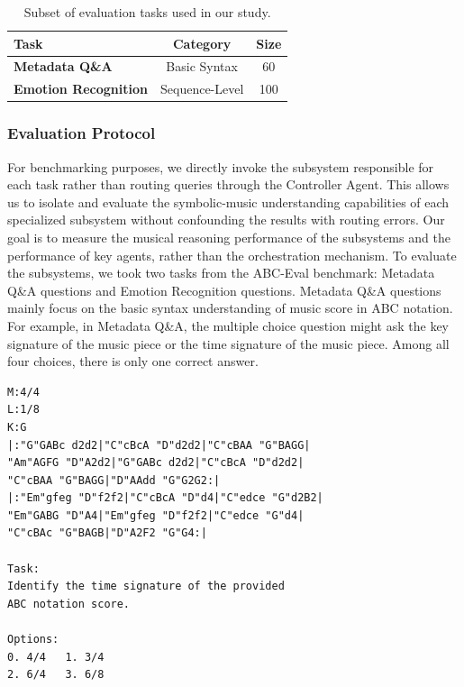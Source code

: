 \documentclass[sigconf]{acmart}
\begin{document}
\begin{table}[H]
\centering
\begin{tabular}{lcc}
\toprule
\textbf{Task} & \textbf{Category} & \textbf{Size} \\
\midrule
\textbf{Metadata Q\&A} & Basic Syntax & 60 \\
\textbf{Emotion Recognition} & Sequence-Level & 100 \\
\bottomrule
\end{tabular}
\caption{Subset of evaluation tasks used in our study.}
\label{tab:tasks}
\end{table}

\subsubsection {Evaluation Protocol}
For benchmarking purposes, we directly invoke the subsystem responsible for each task rather than routing queries through the Controller Agent. This allows us to isolate and evaluate the symbolic-music understanding capabilities of each specialized subsystem without confounding the results with routing errors. Our goal is to measure the musical reasoning performance of the subsystems and the performance of key agents, rather than the orchestration mechanism. To evaluate the subsystems, we took two tasks from the ABC-Eval benchmark: Metadata Q\&A questions and Emotion Recognition questions. Metadata Q\&A questions mainly focus on the basic syntax understanding of music score in ABC notation. For example, in Metadata Q\&A, the multiple choice question might ask the key signature of the music piece or the time signature of the music piece. Among all four choices, there is only one correct answer. 

\begin{tcolorbox}[title=Metadata Q\&A, colback=gray!10, colframe=gray!60, listing only]
\begin{verbatim}
M:4/4
L:1/8
K:G
|:"G"GABc d2d2|"C"cBcA "D"d2d2|"C"cBAA "G"BAGG|
"Am"AGFG "D"A2d2|"G"GABc d2d2|"C"cBcA "D"d2d2|
"C"cBAA "G"BAGG|"D"AAdd "G"G2G2:|
|:"Em"gfeg "D"f2f2|"C"cBcA "D"d4|"C"edce "G"d2B2|
"Em"GABG "D"A4|"Em"gfeg "D"f2f2|"C"edce "G"d4|
"C"cBAc "G"BAGB|"D"A2F2 "G"G4:|

Task:
Identify the time signature of the provided 
ABC notation score.

Options:
0. 4/4   1. 3/4
2. 6/4   3. 6/8
\end{verbatim}
\end{tcolorbox}
\end{document}
